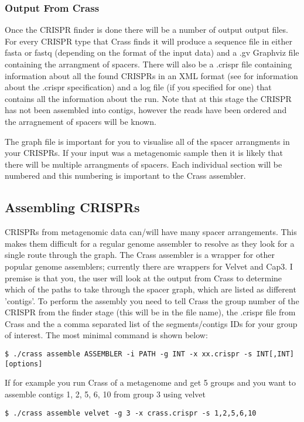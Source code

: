 \documentclass[11pt]{article} %
\begin{document}
\subsubsection{Output From Crass}
Once the CRISPR finder is done there will be a number of output output files.  For every CRISPR type that Crass finds it will produce a sequence file in either fasta or fastq (depending on the format of the input data) and a .gv Graphviz file containing the arrangment of spacers.  There will also be a .crispr file containing information about all the found CRISPRs in an XML format (see  for information about the .crispr specification) and a log file (if you specified for one) that contains all the information about the run. Note that at this stage the CRISPR has not been assembled into contigs, however the reads have been ordered and the arragnement of spacers will be known.

The graph file is important for you to visualise all of the spacer arrangments in your CRISPRs.  If your input was a metagenomic sample then it is likely that there will be multiple arrangments of spacers.  Each individual section will be numbered and this numbering is important to the Crass assembler.   
\subsection{Assembling CRISPRs}
CRISPRs from metagenomic data can/will have many spacer arrangements.  This makes them difficult for a regular genome assembler to resolve as they look for a single route through the graph.   The Crass assembler is a wrapper for other popular genome assemblers; currently there are wrappers for Velvet and Cap3.  I premise is that you, the user will look at the output from Crass to determine which of the paths to take through the spacer graph, which are listed as different 'contigs'. To perform the assembly you need to tell Crass the group number of the CRISPR from the finder stage (this will be in the file name), the .crispr file from Crass and the a comma separated list of the segments/contigs IDs for your group of interest.  The most minimal command is shown below: 
 \begin{lstlisting}[basicstyle=\footnotesize]
$ ./crass assemble ASSEMBLER -i PATH -g INT -x xx.crispr -s INT[,INT] [options]
\end{lstlisting}
 If for example you run Crass of a metagenome and get 5 groups and you want to assemble contigs 1, 2, 5, 6, 10 from group 3 using velvet
 \begin{lstlisting}[basicstyle=\footnotesize]
$ ./crass assemble velvet -g 3 -x crass.crispr -s 1,2,5,6,10
\end{lstlisting}
\end{document}
